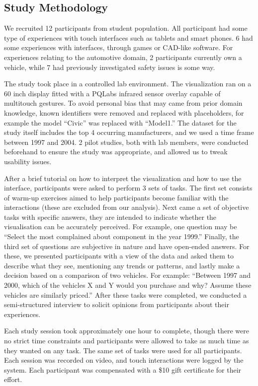 \subsection{Study Methodology}
We recruited 12 participants from student population. All participant had some
type of experiences with touch interfaces such as tablets and smart phones. 6
had some experiences with \threed interfaces, through games or CAD-like
software. For experiences relating to the automotive domain, 2 participants
currently own a vehicle, while 7 had previously investigated safety issues is
some way. 
 

The study took place in a controlled lab environment. The visualization ran on
a 60 inch display fitted with a PQLabs infrared sensor overlay capable of
multitouch gestures. To avoid personal bias that may came from prior domain
knowledge, known identifiers were removed and replaced with placeholders,
for example the model ``Civic'' was replaced with ``Model1.'' The dataset for
the study itself includes the top 4 occurring manufacturers, and we used a time
frame between 1997 and 2004. 2 pilot studies, both with lab members, were
conducted beforehand to ensure the study was appropriate, and allowed us to
tweak usability issues.


After a brief tutorial on how to interpret the visualization and how to use the
interface, participants were asked to perform 3 sets of tasks. The first set
consists of warm-up exercises aimed to help participants become familiar with the 
interactions (these are excluded from our analysis). Next came a set of
objective tasks with specific answers, they are intended to indicate whether the
\threed visualisation can be accurately perceived. For example, one question may
be ``Select the most complained about component in the year 1999.'' Finally,
the third set of questions are subjective in nature and have open-ended answers.
For these, we presented participants with a view of the data and asked them to
describe what they see, mentioning any trends or patterns, and lastly make a
decision based on a comparison of two vehicles. For example: ``Between 1997 and
2000, which of the vehicles X and Y would you purchase and why? Assume these vehicles are
similarly priced.'' After these tasks were completed, we conducted a
semi-structured interview to solicit opinions from participants about their
experiences.  

Each study session took approximately one hour to complete, though there were no
strict time constraints and participants were allowed to take as much time as
they wanted on any task. The same set of tasks were used for all
participants. Each session was recorded on video, and touch interactions were
logged by the system. Each participant was compensated with a \$10 gift
certificate for their effort.
 

